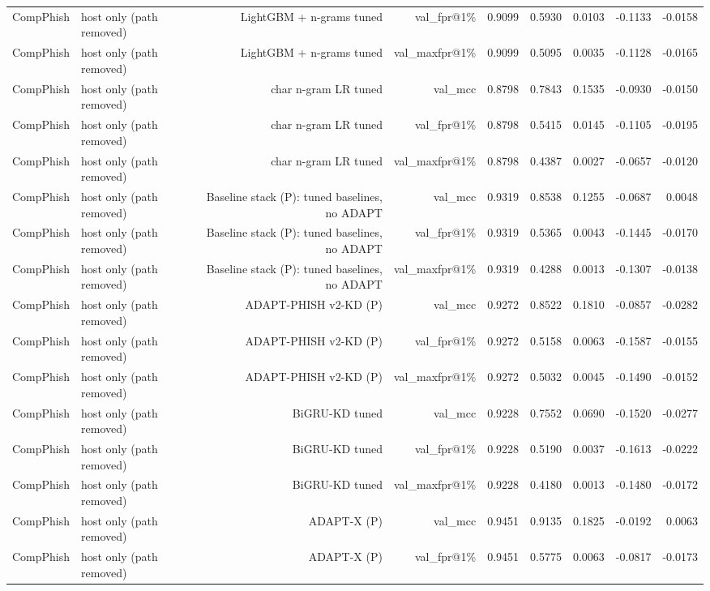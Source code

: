 \begin{table}[t]
\begin{tabular}{llrrrrrrr}
CompPhish & host only (path removed) & LightGBM + n-grams tuned & val\_fpr@1\% & 0.9099 & 0.5930 & 0.0103 & -0.1133 & -0.0158 \\
CompPhish & host only (path removed) & LightGBM + n-grams tuned & val\_maxfpr@1\% & 0.9099 & 0.5095 & 0.0035 & -0.1128 & -0.0165 \\
CompPhish & host only (path removed) & char n-gram LR tuned & val\_mcc & 0.8798 & 0.7843 & 0.1535 & -0.0930 & -0.0150 \\
CompPhish & host only (path removed) & char n-gram LR tuned & val\_fpr@1\% & 0.8798 & 0.5415 & 0.0145 & -0.1105 & -0.0195 \\
CompPhish & host only (path removed) & char n-gram LR tuned & val\_maxfpr@1\% & 0.8798 & 0.4387 & 0.0027 & -0.0657 & -0.0120 \\
CompPhish & host only (path removed) & Baseline stack (P): tuned baselines, no ADAPT & val\_mcc & 0.9319 & 0.8538 & 0.1255 & -0.0687 & 0.0048 \\
CompPhish & host only (path removed) & Baseline stack (P): tuned baselines, no ADAPT & val\_fpr@1\% & 0.9319 & 0.5365 & 0.0043 & -0.1445 & -0.0170 \\
CompPhish & host only (path removed) & Baseline stack (P): tuned baselines, no ADAPT & val\_maxfpr@1\% & 0.9319 & 0.4288 & 0.0013 & -0.1307 & -0.0138 \\
CompPhish & host only (path removed) & ADAPT-PHISH v2-KD (P) & val\_mcc & 0.9272 & 0.8522 & 0.1810 & -0.0857 & -0.0282 \\
CompPhish & host only (path removed) & ADAPT-PHISH v2-KD (P) & val\_fpr@1\% & 0.9272 & 0.5158 & 0.0063 & -0.1587 & -0.0155 \\
CompPhish & host only (path removed) & ADAPT-PHISH v2-KD (P) & val\_maxfpr@1\% & 0.9272 & 0.5032 & 0.0045 & -0.1490 & -0.0152 \\
CompPhish & host only (path removed) & BiGRU-KD tuned & val\_mcc & 0.9228 & 0.7552 & 0.0690 & -0.1520 & -0.0277 \\
CompPhish & host only (path removed) & BiGRU-KD tuned & val\_fpr@1\% & 0.9228 & 0.5190 & 0.0037 & -0.1613 & -0.0222 \\
CompPhish & host only (path removed) & BiGRU-KD tuned & val\_maxfpr@1\% & 0.9228 & 0.4180 & 0.0013 & -0.1480 & -0.0172 \\
CompPhish & host only (path removed) & ADAPT-X (P) & val\_mcc & 0.9451 & 0.9135 & 0.1825 & -0.0192 & 0.0063 \\
CompPhish & host only (path removed) & ADAPT-X (P) & val\_fpr@1\% & 0.9451 & 0.5775 & 0.0063 & -0.0817 & -0.0173 \\

\end{tabular}
\end{table}

